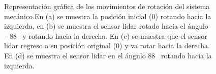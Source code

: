 \begin{figure}[ht!]
     \begin{center}
    \end{center}
  \captionsetup{font=footnotesize}
    \caption{\label{f:Rot3D}Representación gráfica de los movimientos de rotación del sistema 
    mecánico.En (a) se muestra la posición inicial (0\grad) rotando hacia la izquierda, en (b) se 
    muestra el sensor lidar rotado hacia el ángulo $-88$\grad~ y rotando hacia la derecha. En (c) 
    se muestra que el sensor lidar regreso a su posición original (0\grad) y va rotar hacia la 
    derecha. En (d) se muestra el sensor lidar en el ángulo $88$\grad~ rotando hacia la izquierda.}
\end{figure}

